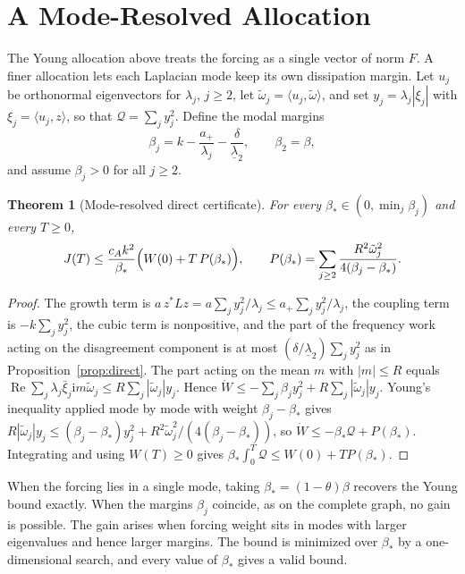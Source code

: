 \documentclass[11pt,notitlepage]{report}
\newtheorem{theorem}{Theorem}[chapter]
\theoremstyle{definition}
\theoremstyle{remark}
\newcommand{\re}{\operatorname{Re}}
\newcommand{\ii}{\mathrm i}
\begin{document}
\section{A Mode-Resolved Allocation}
The Young allocation above treats the forcing as a single vector of norm $F$. A finer allocation lets each Laplacian mode keep its own dissipation margin. Let $u_j$ be orthonormal eigenvectors for $\lambda_j$, $j\ge2$, let $\tilde\omega_j=\langle u_j,\tilde\omega\rangle$, and set $y_j=\lambda_j|\xi_j|$ with $\xi_j=\langle u_j,z\rangle$, so that $\mathcal Q=\sum_jy_j^2$. Define the modal margins
\[
\beta_j=k-\frac{a_+}{\lambda_j}-\frac{\delta}{\underline\lambda_2},\qquad \beta_2=\beta,
\]
and assume $\beta_j>0$ for all $j\ge2$.
\begin{theorem}[Mode-resolved direct certificate]\label{th:moderes}
For every $\beta_\ast\in(0,\min_j\beta_j)$ and every $T\ge0$,
\[
J(T)\le\frac{c_Ak^2}{\beta_\ast}\Bigl(W(0)+T\,P(\beta_\ast)\Bigr),\qquad P(\beta_\ast)=\sum_{j\ge2}\frac{R^2\tilde\omega_j^2}{4(\beta_j-\beta_\ast)}.
\]
\end{theorem}
\begin{proof}
The growth term is $a\,z^*Lz=a\sum_jy_j^2/\lambda_j\le a_+\sum_jy_j^2/\lambda_j$, the coupling term is $-k\sum_jy_j^2$, the cubic term is nonpositive, and the part of the frequency work acting on the disagreement component is at most $(\delta/\underline\lambda_2)\sum_jy_j^2$ as in Proposition~\ref{prop:direct}. The part acting on the mean $m$ with $|m|\le R$ equals $\re\sum_j\lambda_j\bar\xi_j\ii m\tilde\omega_j\le R\sum_j|\tilde\omega_j|y_j$. Hence $\dot W\le-\sum_j\beta_jy_j^2+R\sum_j|\tilde\omega_j|y_j$. Young's inequality applied mode by mode with weight $\beta_j-\beta_\ast$ gives $R|\tilde\omega_j|y_j\le(\beta_j-\beta_\ast)y_j^2+R^2\tilde\omega_j^2/(4(\beta_j-\beta_\ast))$, so $\dot W\le-\beta_\ast\mathcal Q+P(\beta_\ast)$. Integrating and using $W(T)\ge0$ gives $\beta_\ast\int_0^T\mathcal Q\le W(0)+TP(\beta_\ast)$.
\end{proof}
When the forcing lies in a single mode, taking $\beta_\ast=(1-\theta)\beta$ recovers the Young bound exactly. When the margins $\beta_j$ coincide, as on the complete graph, no gain is possible. The gain arises when forcing weight sits in modes with larger eigenvalues and hence larger margins. The bound is minimized over $\beta_\ast$ by a one-dimensional search, and every value of $\beta_\ast$ gives a valid bound.
\end{document}
